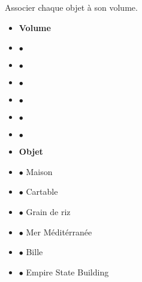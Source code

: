 \begin{exercice*}
   Associer chaque objet à son volume.

   \begin{minipage}{0.35\linewidth}      
         \begin{itemize}
            \item[] {\bfseries Volume}
            \item[]   \hfill $\bullet$
            \item[]  \hfill $\bullet$
            \item[]  \hfill $\bullet$
            \item[]  \hfill $\bullet$
            \item[]  \hfill $\bullet$
            \item[]  \hfill $\bullet$
         \end{itemize}      
   \end{minipage}
   \hfill
   \begin{minipage}{0.5\linewidth}
      \begin{itemize}
         \item[] \phantom{$\bullet$} {\bfseries Objet}
         \item[] $\bullet$ Maison
         \item[] $\bullet$ Cartable
         \item[] $\bullet$ Grain de riz
         \item[] $\bullet$ Mer Méditérranée
         \item[] $\bullet$ Bille
         \item[] $\bullet$ Empire State Building
      \end{itemize}      
   \end{minipage}
\end{exercice*}